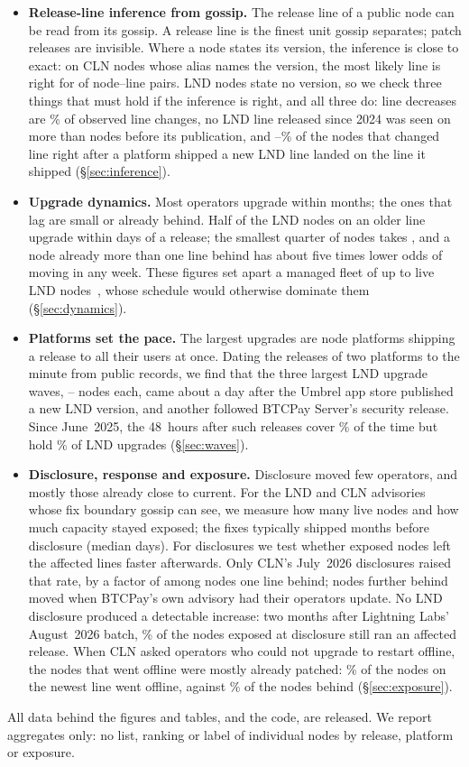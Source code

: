 \begin{itemize}
\item \textbf{Release-line inference from gossip.} The release line of a public node can be read from its gossip.
A release line is the finest unit gossip separates; patch releases are invisible. Where a node states its version, the
inference is close to exact: on CLN nodes whose alias names the version, the most likely line is right for
\NVerNodeLinesExact{} of \NVerNodeLines{} node--line pairs. LND nodes state no version, so we check three things that
must hold if the inference is right, and all three do: line decreases are \PctDownLND\% of observed line changes, no
LND line released since 2024 was seen on more than \PreRelLndMax{} nodes before its publication, and
\PlatLineMin--\PlatLineMax\% of the nodes that changed line right after a platform shipped a new LND line landed on
the line it shipped (\S\ref{sec:inference}).
\item \textbf{Upgrade dynamics.} Most operators upgrade within months; the ones that lag are small or already behind. Half of the
LND nodes on an older line upgrade within \MedianLNDAll{} days of a release; the smallest quarter of nodes takes
\MedianLNDSmall{}, and a node already more than one line behind has about five times lower odds of moving in any
week. These figures set apart a managed fleet of up to \FleetPeakNodes{} live LND
nodes~\cite{kumar2026clientdiversity}, whose schedule would otherwise dominate them (\S\ref{sec:dynamics}).
\item \textbf{Platforms set the pace.} The largest upgrades are node platforms shipping a release to all their users
at once. Dating the releases of two platforms to the minute from public records, we find that the three largest LND
upgrade waves, \WaveUmbrelMinNodes--\WaveUmbrelMaxNodes{} nodes each, came about a day after the Umbrel app store
published a new LND version, and another followed BTCPay Server's security release. Since June~2025, the 48~hours
after such releases cover \PlatTimeLND\% of the time but hold \PlatShareLND\% of LND upgrades (\S\ref{sec:waves}).
\item \textbf{Disclosure, response and exposure.} Disclosure moved few operators, and mostly those already close to
current. For the \NAdvTotal{} LND and CLN advisories whose fix boundary gossip can see, we measure how many live nodes
and how much capacity stayed exposed; the fixes typically shipped months before disclosure (median \FixToDiscMedian{}
days). For \NResp{} disclosures we test whether exposed nodes left the affected lines faster afterwards. Only CLN's
July~2026 disclosures
raised that rate, by a factor of \RROpClnRecent{} among nodes one line behind; nodes further behind moved when
BTCPay's own advisory had their operators update. No LND disclosure produced a detectable increase: two months after
Lightning Labs' August~2026 batch, \PctCohortStillLLBatch\% of the nodes exposed at disclosure still ran an affected
release. When CLN asked operators who could not upgrade to restart offline, the nodes that went offline were mostly
already patched: \OffCallNewestLeft\% of the nodes on the newest line went offline, against \OffCallBehindLeft\% of
the nodes behind (\S\ref{sec:exposure}).
\end{itemize}

All data behind the figures and tables, and the code, are released. We report aggregates only: no list, ranking or
label of individual nodes by release, platform or exposure.
